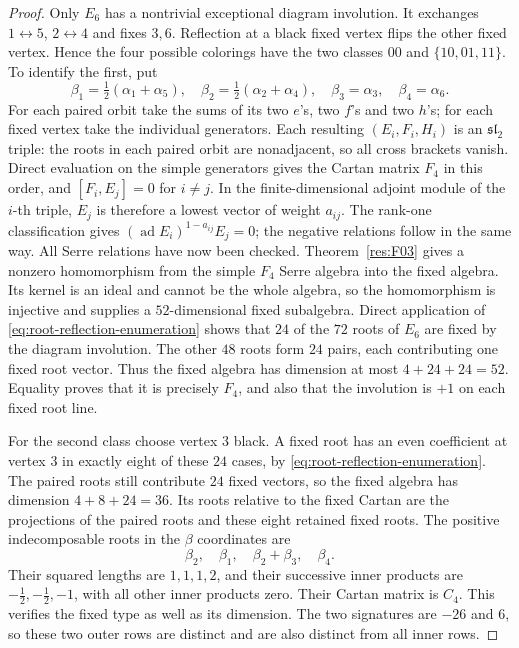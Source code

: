 \begin{proof}
Only \(E_6\) has a nontrivial exceptional diagram involution.
It exchanges \(1\leftrightarrow5\), \(2\leftrightarrow4\)
and fixes \(3,6\). Reflection at a black fixed vertex
flips the other fixed vertex. Hence the four possible
colorings have the two classes \(00\) and
\(\{10,01,11\}\).
To identify the first, put
\[
 \beta_1=\tfrac12(\alpha_1+\alpha_5),\quad
 \beta_2=\tfrac12(\alpha_2+\alpha_4),\quad
 \beta_3=\alpha_3,\quad \beta_4=\alpha_6.
\]
For each paired orbit take the sums of its two \(e\)'s,
two \(f\)'s and two \(h\)'s; for each fixed vertex take
the individual generators. Each resulting
\((E_i,F_i,H_i)\) is an \(\mathfrak{sl}_2\) triple:
the roots in each paired orbit are nonadjacent, so all
cross brackets vanish. Direct evaluation on the simple
generators gives the Cartan matrix \(F_4\) in this order,
and \([F_i,E_j]=0\) for \(i\ne j\).
In the finite-dimensional adjoint module of the \(i\)-th
triple, \(E_j\) is therefore a lowest vector of weight
\(a_{ij}\). The rank-one classification gives
\((\operatorname{ad}E_i)^{1-a_{ij}}E_j=0\);
the negative relations follow in the same way.
All Serre relations have now been checked.
Theorem~\ref{res:F03} gives a nonzero homomorphism from
the simple \(F_4\) Serre algebra into the fixed algebra.
Its kernel is an ideal and cannot be the whole algebra,
so the homomorphism is injective and supplies a
\(52\)-dimensional fixed subalgebra. Direct application of
\eqref{eq:root-reflection-enumeration} shows that \(24\)
of the \(72\) roots of \(E_6\) are fixed by the diagram
involution. The other \(48\) roots form \(24\) pairs,
each contributing one fixed root vector. Thus the
fixed algebra has dimension at most \(4+24+24=52\).
Equality proves that it is precisely \(F_4\), and also
that the involution is \(+1\) on each fixed root line.

For the second class choose vertex \(3\) black. A fixed
root has an even coefficient at vertex \(3\) in exactly
eight of these \(24\) cases, by
\eqref{eq:root-reflection-enumeration}. The paired roots
still contribute \(24\) fixed vectors, so the fixed
algebra has dimension \(4+8+24=36\).
Its roots relative to the fixed Cartan are the projections
of the paired roots and these eight retained fixed roots.
The positive indecomposable roots in the \(\beta\) coordinates are
\[
 \beta_2,\quad\beta_1,\quad\beta_2+\beta_3,\quad\beta_4.
\]
Their squared lengths are \(1,1,1,2\), and their
successive inner products are
\(-\tfrac12,-\tfrac12,-1\), with all other inner
products zero. Their Cartan matrix is \(C_4\).
This verifies the fixed type as well as its dimension.
The two signatures are \(-26\) and \(6\), so these
two outer rows are distinct and are also distinct
from all inner rows.


\end{proof}
